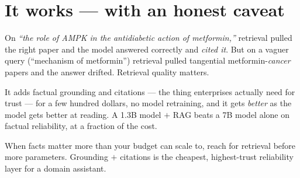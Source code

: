 

\section{It works --- with an honest caveat}
On \emph{``the role of AMPK in the antidiabetic action of metformin,''} retrieval pulled the right paper and
the model answered correctly and \emph{cited it}. But on a vaguer query (``mechanism of metformin'') retrieval
pulled tangential metformin-\emph{cancer} papers and the answer drifted. Retrieval quality matters.

\begin{numbers}
It adds factual grounding and citations --- the thing enterprises actually need for trust --- for a few hundred
dollars, no model retraining, and it gets \emph{better} as the model gets better at reading. A 1.3B model
$+$ RAG beats a 7B model alone on factual reliability, at a fraction of the cost.
\end{numbers}

\begin{lesson}
When facts matter more than your budget can scale to, reach for retrieval before more parameters. Grounding
$+$ citations is the cheapest, highest-trust reliability layer for a domain assistant.
\end{lesson}
